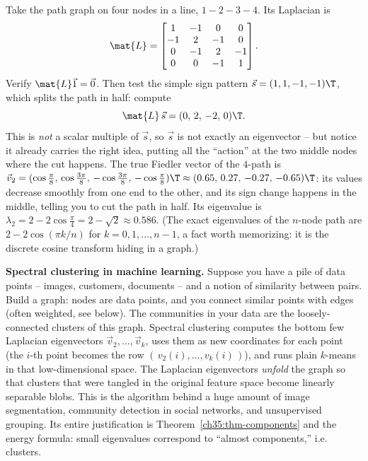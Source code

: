 \begin{labbox}
Take the path graph on four nodes in a line, $1\!-\!2\!-\!3\!-\!4$. Its Laplacian is
\[
\mat{L} =
\begin{bmatrix} 1&-1&0&0\\ -1&2&-1&0\\ 0&-1&2&-1\\ 0&0&-1&1 \end{bmatrix}.
\]
Verify $\mat{L}\vec{1}=\vec0$. Then test the simple sign pattern $\vec{s} = (1,1,-1,-1)\T$,
which splits the path in half: compute
\[
\mat{L}\,\vec{s} = (0,\,2,\,-2,\,0)\T.
\]
This is \emph{not} a scalar multiple of $\vec{s}$, so $\vec{s}$ is not exactly an
eigenvector -- but notice it already carries the right idea, putting all the ``action'' at
the two middle nodes where the cut happens. The true Fiedler vector of the $4$-path is
$\vec{v}_2 = (\cos\tfrac{\pi}{8},\,\cos\tfrac{3\pi}{8},\,-\cos\tfrac{3\pi}{8},\,
-\cos\tfrac{\pi}{8})\T \approx (0.65,\,0.27,\,-0.27,\,-0.65)\T$: its values decrease smoothly
from one end to the other, and its sign change happens in the middle, telling you to cut the
path in half. Its eigenvalue is $\lambda_2 = 2 - 2\cos\tfrac{\pi}{4} = 2 - \sqrt2 \approx
0.586$. (The exact eigenvalues of the $n$-node path are $2 - 2\cos(\pi k/n)$ for
$k = 0,1,\dots,n-1$, a fact worth memorizing: it is the discrete cosine transform hiding in
a graph.)
\end{labbox}

\begin{applicationbox}
\textbf{Spectral clustering in machine learning.} Suppose you have a pile of data points
-- images, customers, documents -- and a notion of similarity between pairs. Build a graph:
nodes are data points, and you connect similar points with edges (often weighted, see
below). The communities in your data are the loosely-connected clusters of this graph.
Spectral clustering computes the bottom few Laplacian eigenvectors $\vec{v}_2,\dots,\vec{v}_k$,
uses them as new coordinates for each point (the $i$-th point becomes the row
$(\,v_2(i),\dots,v_k(i)\,)$), and runs plain $k$-means in that low-dimensional space. The
Laplacian eigenvectors \emph{unfold} the graph so that clusters that were tangled in the
original feature space become linearly separable blobs. This is the algorithm behind a huge
amount of image segmentation, community detection in social networks, and unsupervised
grouping. Its entire justification is Theorem~\ref{ch35:thm-components} and the energy
formula: small eigenvalues correspond to ``almost components,'' i.e. clusters.
\end{applicationbox}

